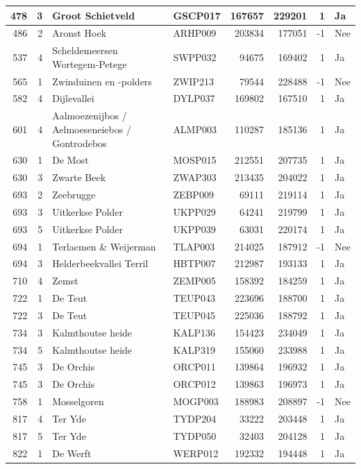 \documentclass[11pt,]{book}
\begin{document}
\begin{table}
\begin{tabular}[t]{r|r|l|l|r|r|r|l}
\hline
478 & 3 & Groot Schietveld & GSCP017 & 167657 & 229201 & 1 & Ja\\
\hline
486 & 2 & Aronst Hoek & ARHP009 & 203834 & 177051 & -1 & Nee\\
\hline
537 & 4 & Scheldemeersen Wortegem-Petege & SWPP032 & 94675 & 169402 & 1 & Ja\\
\hline
565 & 1 & Zwinduinen en -polders & ZWIP213 & 79544 & 228488 & -1 & Nee\\
\hline
582 & 4 & Dijlevallei & DYLP037 & 169802 & 167510 & 1 & Ja\\
\hline
601 & 4 & Aalmoezenijbos / Aelmoeseneiebos / Gontrodebos & ALMP003 & 110287 & 185136 & 1 & Ja\\
\hline
630 & 1 & De Most & MOSP015 & 212551 & 207735 & 1 & Ja\\
\hline
630 & 3 & Zwarte Beek & ZWAP303 & 213435 & 204022 & 1 & Ja\\
\hline
693 & 2 & Zeebrugge & ZEBP009 & 69111 & 219114 & 1 & Ja\\
\hline
693 & 3 & Uitkerkse Polder & UKPP029 & 64241 & 219799 & 1 & Ja\\
\hline
693 & 5 & Uitkerkse Polder & UKPP039 & 63031 & 220174 & 1 & Ja\\
\hline
694 & 1 & Terlaemen \& Weijerman & TLAP003 & 214025 & 187912 & -1 & Nee\\
\hline
694 & 3 & Helderbeekvallei Terril & HBTP007 & 212987 & 193133 & 1 & Ja\\
\hline
710 & 4 & Zemst & ZEMP005 & 158392 & 184259 & 1 & Ja\\
\hline
722 & 1 & De Teut & TEUP043 & 223696 & 188700 & 1 & Ja\\
\hline
722 & 3 & De Teut & TEUP045 & 225036 & 188792 & 1 & Ja\\
\hline
734 & 3 & Kalmthoutse heide & KALP136 & 154423 & 234049 & 1 & Ja\\
\hline
734 & 5 & Kalmthoutse heide & KALP319 & 155060 & 233988 & 1 & Ja\\
\hline
745 & 3 & De Orchis & ORCP011 & 139864 & 196932 & 1 & Ja\\
\hline
745 & 3 & De Orchis & ORCP012 & 139863 & 196973 & 1 & Ja\\
\hline
758 & 1 & Mosselgoren & MOGP003 & 188983 & 208897 & -1 & Nee\\
\hline
817 & 4 & Ter Yde & TYDP204 & 33222 & 203448 & 1 & Ja\\
\hline
817 & 5 & Ter Yde & TYDP050 & 32403 & 204128 & 1 & Ja\\
\hline
822 & 1 & De Werft & WERP012 & 192332 & 194448 & 1 & Ja\\

\end{tabular}
\end{table}
\end{document}
